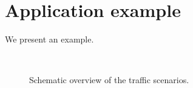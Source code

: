 \section{Application example}

\color{red}

We present an example.

\begin{figure}
	\centering
	\setlength\figureheight{100pt}
	\setlength\figurewidth{260pt}
	\\
	\caption{Schematic overview of the traffic scenarios.}
\end{figure}

\color{black}
